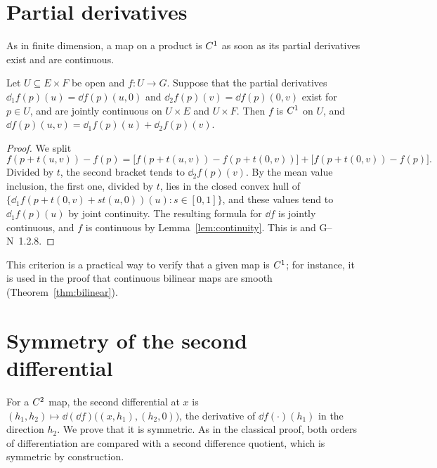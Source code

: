 \section{Partial derivatives}

As in finite dimension, a map on a product is $C^{1}$ as soon as its partial derivatives exist
and are continuous.

\begin{theorem}
  \label{thm:partials}
  \leanok
  Let $U \subseteq E \times F$ be open and $f \colon U \to G$. Suppose that the partial
  derivatives $\dd_1 f(p)(u) = \dd f(p)(u, 0)$ and $\dd_2 f(p)(v) = \dd f(p)(0, v)$ exist for
  $p \in U$, and are jointly continuous on $U \times E$ and $U \times F$. Then $f$ is $C^{1}$ on
  $U$, and $\dd f(p)(u, v) = \dd_1 f(p)(u) + \dd_2 f(p)(v)$.
\end{theorem}

\begin{proof}
  \leanok
  We split
  \[
    f(p + t(u,v)) - f(p) = \bigl[f(p + t(u,v)) - f(p + t(0,v))\bigr]
      + \bigl[f(p + t(0,v)) - f(p)\bigr].
  \]
  Divided by $t$, the second bracket tends to $\dd_2 f(p)(v)$. By the mean value inclusion, the
  first one, divided by $t$, lies in the closed convex hull of
  $\{\dd_1 f(p + t(0,v) + st(u,0))(u) : s \in [0,1]\}$, and these values tend to
  $\dd_1 f(p)(u)$ by joint continuity. The resulting formula for $\dd f$ is jointly continuous,
  and $f$ is continuous by Lemma~\ref{lem:continuity}. This is \cite[8.3]{Mic80} and G--N~1.2.8.
\end{proof}

This criterion is a practical way to verify that a given map is $C^{1}$; for instance, it is
used in the proof that continuous bilinear maps are smooth (Theorem~\ref{thm:bilinear}).

\section{Symmetry of the second differential}

For a $C^{2}$ map, the second differential at $x$ is
$(h_1, h_2) \mapsto \dd(\dd f)\bigl((x, h_1), (h_2, 0)\bigr)$, the derivative of
$\dd f(\cdot)(h_1)$ in the direction $h_2$. We prove that it is symmetric. As in the classical
proof, both orders of differentiation are compared with a second difference quotient, which is
symmetric by construction.

